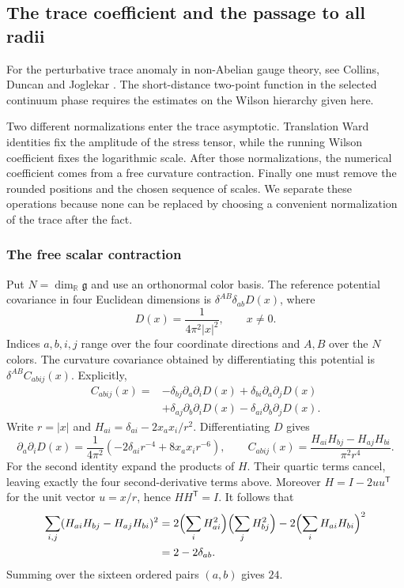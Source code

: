 \subsection{The trace coefficient and the passage to all radii}
\label{sec:trace-asymptotic}

For the perturbative trace anomaly in non-Abelian gauge theory, see
Collins, Duncan and Joglekar \cite{CollinsDuncanJoglekar}. The
short-distance two-point function in the selected continuum phase
requires the estimates on the Wilson hierarchy given here.

Two different normalizations enter the trace asymptotic. Translation Ward
identities fix the amplitude of the stress tensor, while the running Wilson
coefficient fixes the logarithmic scale. After those normalizations, the
numerical coefficient comes from a free curvature contraction. Finally one
must remove the rounded positions and the chosen sequence of scales. We
separate these operations because none can be replaced by choosing a
convenient normalization of the trace after the fact.

\subsubsection{The free scalar contraction}
Put $N=\dim_{\mathbb R}\mathfrak g$ and use an orthonormal color basis.
The reference potential covariance in four Euclidean dimensions is
$\delta^{AB}\delta_{ab}D(x)$, where
\[
 D(x)=\frac1{4\pi^2|x|^2},\qquad x\neq0.
\]
Indices $a,b,i,j$ range over the four coordinate directions and $A,B$
over the $N$ colors. The curvature covariance obtained by differentiating
this potential is $\delta^{AB}C_{abij}(x)$. Explicitly,
\begin{align*}
 C_{abij}(x)={}&-\delta_{bj}\partial_a\partial_iD(x)
       +\delta_{bi}\partial_a\partial_jD(x)\\
       &+\delta_{aj}\partial_b\partial_iD(x)
       -\delta_{ai}\partial_b\partial_jD(x).
\end{align*}
Write $r=|x|$ and $H_{ai}=\delta_{ai}-2x_ax_i/r^2$. Differentiating
$D$ gives
\[
 \partial_a\partial_iD(x)
   =\frac1{4\pi^2}(-2\delta_{ai}r^{-4}+8x_ax_ir^{-6}),
 \qquad
 C_{abij}(x)=\frac{H_{ai}H_{bj}-H_{aj}H_{bi}}{\pi^2r^4}.
\]
For the second identity expand the products of $H$. Their quartic terms
cancel, leaving exactly the four second-derivative terms above.
Moreover $H=I-2uu^{\mathsf T}$ for the unit vector $u=x/r$, hence
$HH^{\mathsf T}=I$. It follows that
\begin{align*}
 \sum_{i,j}(H_{ai}H_{bj}-H_{aj}H_{bi})^2
 &=2\Bigl(\sum_iH_{ai}^2\Bigr)
       \Bigl(\sum_jH_{bj}^2\Bigr)
       -2\Bigl(\sum_iH_{ai}H_{bi}\Bigr)^2\\
 &=2-2\delta_{ab}.
\end{align*}
Summing over the sixteen ordered pairs $(a,b)$ gives $24$.

